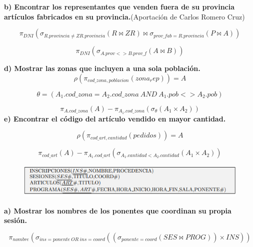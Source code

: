 \documentclass[a4paper,11pt]{article}
\begin{document}
\textbf{b) Encontrar los representantes que venden fuera de su provincia artículos fabricados en su provincia.}(Aportación de Carlos Romero Cruz)

\begin{equation*}
\pi_{DNI}(\sigma_{R.provincia\neq ZR.provincia}(R\Join ZR)\Join \sigma_{prov\_fab=R.provincia}(P\Join A))
\end{equation*}

\begin{equation*}
\pi_{DNI}(\sigma_{A.prov<> B.prov\_f}(A\Join B))
\end{equation*}

\textbf{d) Mostrar las zonas que incluyen a una sola población.}
\begin{equation*}
\rho(\pi_{cod\_zona,poblacion}(zona_rep))=A
\end{equation*}

\begin{equation*}
\theta=(A_1.cod\_zona=A_2.cod\_zona \> AND \> A_1.pob<>A_2.pob)
\end{equation*}

\begin{equation*}
\pi_{A.cod\_zona}(A)-\pi_{A_1.cod\_zona}(\sigma_{\theta}(A_1\times A_2))
\end{equation*}
\textbf{e) Encontrar el código del artículo vendido en mayor cantidad.}

\begin{equation*}
\rho(\pi_{cod\_art,cantidad}(pedidos))=A
\end{equation*}

\begin{equation*}
\pi_{cod\_art}(A)-\pi_{A_1.cod\_art}(\sigma_{A_1.cantidad < A_2.cantidad}(A_1\times A_2))
\end{equation*}

\begin{figure}[h]
\centering
\includegraphics[scale=1,width=1\textwidth]{ejer6.png}
\end{figure}

\textbf{a) Mostrar los nombres de los ponentes que coordinan su propia sesión.}

\begin{equation*}
\pi_{nombre}(\sigma_{ins=ponente \> OR \> ins=coord}((\sigma_{ponente=coord}(SES\Join PROG))\times INS))
\end{equation*}
\end{document}
